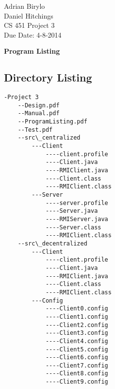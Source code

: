 \documentclass{article}
\begin{document}
\begin{flushright}
Adrian Birylo\\
Daniel Hitchings\\
CS 451 Project 3\\
Due Date: 4-8-2014\\
\end{flushright}

\begin{center}
\textbf{\huge{Program Listing}}
\end{center}


\subsection*{Directory Listing}

\begin{verbatim}
-Project 3
 	--Design.pdf
 	--Manual.pdf
 	--ProgramListing.pdf
 	--Test.pdf
 	--src\_centralized
 		---Client
 			----client.profile
 			----Client.java
	 		----RMIClient.java
 			----Client.class
 			----RMIClient.class
 		---Server
 			----server.profile
 			----Server.java
 			----RMIServer.java
 			----Server.class
 			----RMIClient.class
 	--src\_decentralized
 		---Client
 			----client.profile
 			----Client.java
	 		----RMIClient.java
 			----Client.class
 			----RMIClient.class
 		---Config
 			----Client0.config
 			----Client1.config
 			----Client2.config
 			----Client3.config
 			----Client4.config
 			----Client5.config
 			----Client6.config
 			----Client7.config
 			----Client8.config
 			----Client9.config
 			

\end{verbatim}
\end{document}

